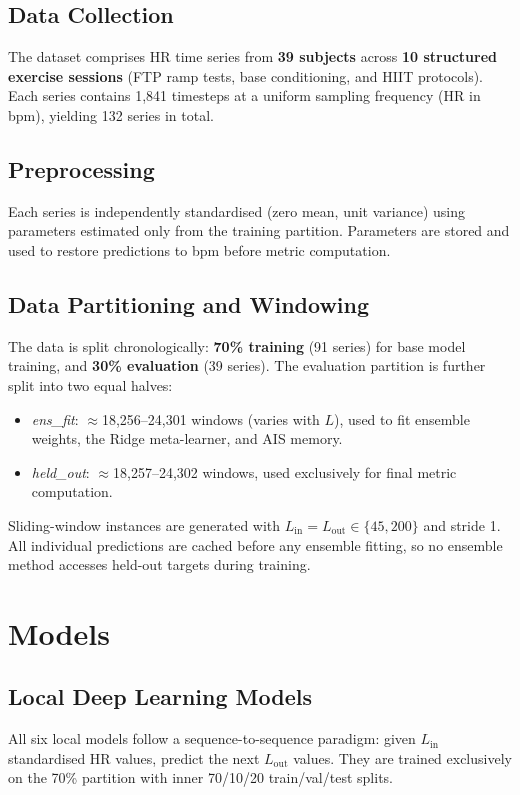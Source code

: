 \documentclass[conference]{IEEEtran}
\newcommand{\Lin}{L_{\mathrm{in}}}
\newcommand{\Lout}{L_{\mathrm{out}}}
\begin{document}
\subsection{Data Collection}
The dataset comprises HR time series from \textbf{39 subjects} across
\textbf{10 structured exercise sessions} (FTP ramp tests, base conditioning,
and HIIT protocols). Each series contains 1,841 timesteps at a uniform
sampling frequency (HR in bpm), yielding 132 series in total.

\subsection{Preprocessing}
Each series is independently standardised (zero mean, unit variance) using
parameters estimated only from the training partition. Parameters are stored
and used to restore predictions to bpm before metric computation.

\subsection{Data Partitioning and Windowing}
The data is split chronologically: \textbf{70\% training} (91 series) for
base model training, and \textbf{30\% evaluation} (39 series). The evaluation
partition is further split into two equal halves:
\begin{itemize}[noitemsep,topsep=2pt]
  \item \textit{ens\_fit}: $\approx$18,256--24,301 windows (varies with $L$),
        used to fit ensemble weights, the Ridge meta-learner, and AIS memory.
  \item \textit{held\_out}: $\approx$18,257--24,302 windows, used exclusively
        for final metric computation.
\end{itemize}

Sliding-window instances are generated with $\Lin = \Lout \in \{45, 200\}$
and stride 1. All individual predictions are cached before any ensemble
fitting, so no ensemble method accesses held-out targets during training.

\section{Models}
\label{sec:models}

\subsection{Local Deep Learning Models}
All six local models follow a sequence-to-sequence paradigm: given $\Lin$
standardised HR values, predict the next $\Lout$ values. They are trained
exclusively on the 70\% partition with inner 70/10/20 train/val/test splits.
\end{document}
